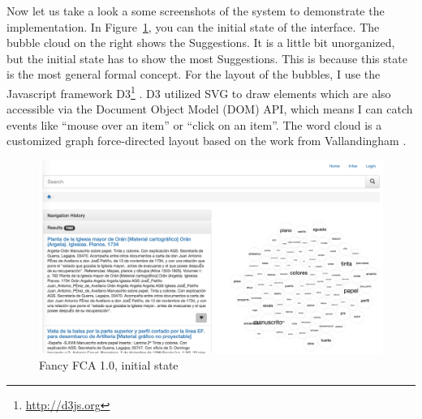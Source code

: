 \documentclass[11pt]{report}
\begin{document}
Now let us take a look a some screenshots of the system to demonstrate the implementation. In Figure~\ref{figure:fancy1}, you can the initial state of the interface. The bubble cloud on the right shows the Suggestions. It is a little bit unorganized, but the initial state has to show the most Suggestions. This is because this state is the most general formal concept. For the layout of the bubbles, I use the Javascript framework D3\footnote{\url{http://d3js.org}} \cite{Bostock2011}. D3 utilized SVG to draw elements which are also accessible via the Document Object Model (DOM) API, which means I can catch events like ``mouse over an item'' or ``click on an item''. The word cloud is a customized graph force-directed layout based on the work from Vallandingham \cite{Vallandingham}. \\

\begin{figure}[!ht]
	\centering
	\includegraphics[width=\linewidth]{images/fancy1}
\caption{Fancy FCA 1.0, initial state}
\label{figure:fancy1}
\end{figure}
\end{document}
